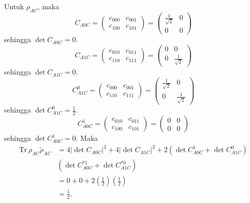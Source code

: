 Untuk $\rho_{AC}$, maka
\begin{equation}
	C_{A0C}=
	\begin{pmatrix}
		c_{000} & c_{001} \\
		c_{100} & c_{101}
	\end{pmatrix}=
	\begin{pmatrix}
		\frac{1}{\sqrt{2}} & 0 \\
		0 & 0
	\end{pmatrix}
\end{equation}
sehingga $\det C_{A0C} = 0$.
\begin{equation}
	C_{A1C}=
	\begin{pmatrix}
		c_{010} & c_{011} \\
		c_{110} & c_{111}
	\end{pmatrix}=
	\begin{pmatrix}
		0 & 0 \\
		0 & \frac{1}{\sqrt{2}}
	\end{pmatrix}
\end{equation}
sehingga $\det C_{A1C} = 0$.
\begin{equation}
	C_{A1C}^0=
	\begin{pmatrix}
		c_{000} & c_{001} \\
		c_{110} & c_{111}
	\end{pmatrix}=
	\begin{pmatrix}
		\frac{1}{\sqrt{2}} & 0 \\
		0 & \frac{1}{\sqrt{2}}
	\end{pmatrix}
\end{equation}
sehingga $\det C_{A1C}^0 = \frac{1}{2}$.
\begin{equation}
	C_{A0C}^1=
	\begin{pmatrix}
		c_{010} & c_{011} \\
		c_{100} & c_{101}
	\end{pmatrix}=
	\begin{pmatrix}
		0 & 0 \\
		0 & 0
	\end{pmatrix}
\end{equation}
sehingga $\det C_{A0C}^1 = 0$. Maka
\begin{equation}
	\begin{aligned}
		\mathrm{Tr}\,\rho_{AC}\tilde{\rho}_{AC}
		&=4 |\det C_{A0C}|^2+ 4 |\det C_{A1C}|^2+ 2 (\det C_{A0C}^1 + \det C_{A1C}^0)\\
		&(\det C^{*1}_{A0C} + \det C^{*0}_{A1C})\\
		&=0+0+2(\frac{1}{2})(\frac{1}{2})\\
		&=\frac{1}{2}.
	\end{aligned}
\end{equation}
